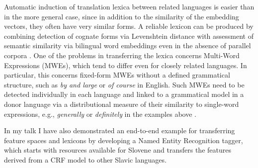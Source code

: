 \documentclass[11pt]{article}
\begin{document}
Automatic induction of translation lexica between related languages is easier than in the more general case, since in addition to the similarity of the embedding vectors, they often have very similar forms.  A reliable lexicon can be produced by combining detection of cognate forms via Levenshtein distance with assessment of semantic similarity via bilingual word embeddings even in the absence of parallel corpora \cite{upadhyay16}.
One of the problems in transferring the lexica concerns Multi-Word Expressions (MWEs), which tend to differ even for closely related languages.  In particular, this concerns fixed-form MWEs without a defined grammatical structure, such as \textit{by and large} or \textit{of course} in English.  Such MWEs need to be detected individually in each language and linked to a grammatical model in a donor language via a distributional measure of their similarity to single-word expressions, e.g., \textit{generally} or \textit{definitely} in the examples above \cite{riedl15}.

In my talk I have also demonstrated an end-to-end example for transferring feature spaces and lexicons by developing a Named Entity Recognition tagger, which starts with resources available for Slovene and transfers the features derived from a CRF model \cite{lafferty01,benikova15} to other Slavic languages.



\end{document}
